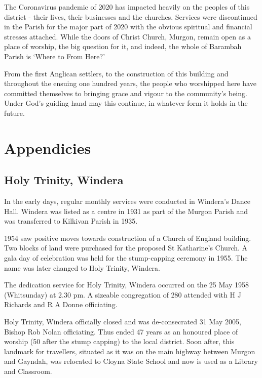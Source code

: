 The Coronavirus pandemic of 2020 has impacted heavily on the peoples of this district - their lives, their businesses and the churches. Services were discontinued in the Parish for the major part of 2020 with the obvious spiritual and financial stresses attached. While the doors of Christ Church, Murgon, remain open as a place of worship, the big question for it, and indeed, the whole of Barambah Parish is `Where to From Here?'



From the first Anglican settlers, to the construction of this building and throughout the ensuing one hundred years, the people who worshipped here have committed themselves to bringing grace and vigour to the community's being. Under God's guiding hand may this continue, in whatever form it holds in the future.

\balance


\backmatter
\chapter{Appendicies}
\nobalance


\section{Holy Trinity, Windera}



In the early days, regular monthly services were conducted in Windera's Dance Hall. Windera was listed as a centre in 1931 as part of the Murgon Parish and was transferred to Kilkivan Parish in 1935.



1954 saw positive moves towards construction of a Church of England building. Two blocks of land were purchased for the proposed St Katharine's Church. A gala day of celebration was held for the stump-capping ceremony in 1955. The name was later changed to Holy Trinity, Windera.



The dedication service for Holy Trinity, Windera occurred on the 25 May 1958 (Whitsunday) at 2.30 pm. A sizeable congregation of 280 attended with H J Richards and R A Donne officiating.



Holy Trinity, Windera officially closed and was de-consecrated 31 May 2005, Bishop Rob Nolan officiating. Thus ended 47 years as an honoured place of worship (50 after the stump capping) to the local district. Soon after, this landmark for travellers, situated as it was on the main highway between Murgon and Gayndah, was relocated to Cloyna State School and now is used as a Library and Classroom.



